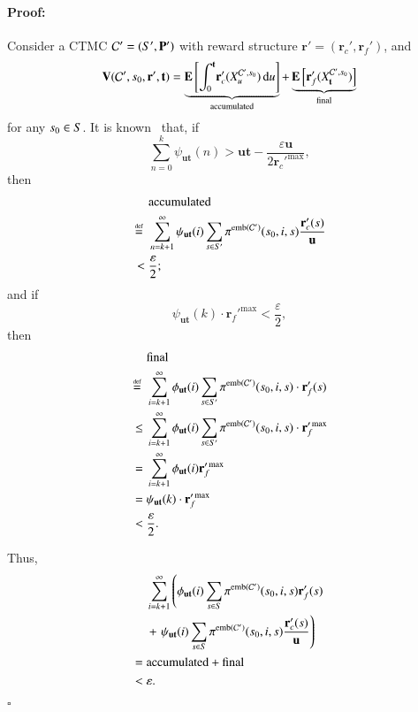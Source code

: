 \documentclass[10pt,twocolumn]{article}
\newenvironment{proof}{\paragraph{Proof:}}{\hfill$\square$}
\newcommand{\states} {{\ensuremath S}}
\newcommand{\state}  {{\ensuremath s}}
\newcommand{\pmat}{\mathbf{P}}
\newcommand{\cmodel}{\mathcal{C}}
\newcommand{\diff}{\mathrm{d}}
\newcommand{\urate}{\mathbf{u}}
\newcommand{\expect}{\mathbf{E}}
\newcommand{\rew}{\mathbf{r}}
\newcommand{\frew}{\mathbf{r}_f}
\newcommand{\crew}{\mathbf{r}_c}
\newcommand{\timeb}{\mathbf{t}}
\newcommand{\mvalue}{\mathbf{V}}
\newcommand{\precision}{\varepsilon}
\newcommand{\emb}{\mathrm{emb}}
\newcommand{\stopro}{X}
\newcommand{\defeq}{\,\stackrel{\mbox{\rm {\tiny def}}}{=}\,}
\newcommand{\tprob}{\pi}
\begin{document}
\begin{proof}
Consider a CTMC $\cmodel' = (\states', \pmat')$ with reward structure $\rew' = (\crew', \frew')$, and
\begin{equation*}
\mvalue(\cmodel', \state_0, \rew', \timeb) = \underbrace{\expect \left[\int_0^\timeb \! \crew'(\stopro_u^{\cmodel',\state_0}) \, \diff u \right]}_{\mathrm{accumulated}} + \underbrace{\expect \left[\frew'(\stopro_\timeb^{\cmodel',\state_0}) \right]}_{\mathrm{final}}
\end{equation*}
for any $\state_0 \in \states$.
It is known~\cite[remark below Theorem 2]{KwiatkowskaNP06} that, if
\begin{equation*}
\sum_{n=0}^k\psi_{\urate \timeb}(n) > \urate \timeb - \frac{\precision \urate}{2\crew'^{\max}},
\end{equation*}
then
\begin{equation*}
\begin{split}
  & \mathrm{accumulated} \\
  \defeq {} & \sum_{n=k+1}^\infty \psi_{\urate \timeb}(i) \sum_{\state \in \states'} \tprob^{\emb(\cmodel')}(\state_0, i, \state) \frac{\crew'(\state)}{\urate} \\
  < {} & \frac{\precision}{2};
\end{split}
\end{equation*}
and if
\begin{equation*}
\psi_{\urate \timeb}(k) \cdot \frew'^{\max} < \frac{\precision}{2},
\end{equation*}
then
\begin{equation*}
\begin{split}
  & \mathrm{final} \\
  \defeq {} & \sum_{i=k+1}^\infty \phi_{\urate \timeb}(i) \sum_{\state \in \states'} \tprob^{\emb(\cmodel')}(\state_0, i, \state) \cdot \frew'(\state) \\
  \leq {} & \sum_{i=k+1}^\infty \phi_{\urate \timeb}(i) \sum_{\state \in \states'} \tprob^{\emb(\cmodel')}(\state_0, i, \state) \cdot \frew'^{\max} \\
  = {} & \sum_{i=k+1}^\infty \phi_{\urate \timeb}(i) \frew'^{\max} \\
  = {} & \psi_{\urate \timeb}(k) \cdot \frew'^{\max} \\
  < {} & \frac{\precision}{2} .
\end{split}
\end{equation*}

Thus,
\begin{equation}
\begin{split}
  & \sum_{i=k+1}^\infty \left(\phi_{\urate \timeb}(i) \sum_{\state \in \states} \tprob^{\emb(\cmodel')}(\state_0, i, \state) \frew'(\state)\right. \\
  & + \left.\psi_{\urate \timeb}(i) \sum_{\state \in \states} \tprob^{\emb(\cmodel')}(\state_0, i, \state)
    \frac{\crew'(\state)}{\urate}\right) \\
  = {} & \mathrm{accumulated} + \mathrm{final} \\
  < {} & \precision .
\end{split}
\end{equation}


\end{proof}
\end{document}
